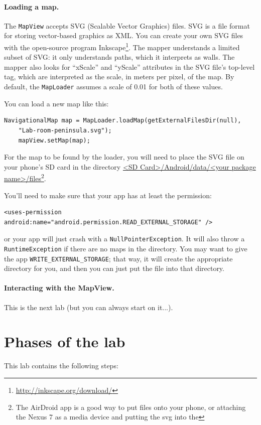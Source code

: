 \documentclass[10pt]{article}
\begin{document}
\paragraph{Loading a map.} The {\tt MapView} accepts SVG (Scalable Vector Graphics) files. SVG is a file format for storing vector-based graphics as XML. You can create your own SVG files with the open-source program Inkscape\footnote{\url{http://inkscape.org/download/}}. The mapper understands a limited subset of SVG: it only understands paths, which it interprets as walls. The mapper also looks for ``xScale'' and ``yScale'' attributes in the SVG file's top-level tag, which are interpreted as the scale, in meters per pixel, of the map. By default, the {\tt MapLoader} assumes a scale of 0.01 for both of these values. 

You can load a new map like this:
\begin{lstlisting}[basicstyle=\ttfamily\small]
    NavigationalMap map = MapLoader.loadMap(getExternalFilesDir(null), 
    "Lab-room-peninsula.svg");
    mapView.setMap(map);
\end{lstlisting}

For the map to be found by the loader, you will need to place the SVG file on your phone's SD card in the directory \url{<SD Card>/Android/data/<your package name>/files}\footnote{The AirDroid app is a good way to put files onto your phone, or attaching the Nexus 7 as a media device and putting the svg into the }. 


You'll need to make sure that your app has at least the permission:
\begin{lstlisting}
<uses-permission android:name="android.permission.READ_EXTERNAL_STORAGE" />
\end{lstlisting}
or your app will just crash with a {\tt NullPointerException}. It will also throw a {\tt RuntimeException} if there are no maps in the directory. You may want
to give the app {\tt WRITE\_EXTERNAL\_STORAGE}; that way, it will create 
the appropriate directory for you, and then you can just put the file into that
directory.



\paragraph{Interacting with the MapView.}
This is the next lab (but you can always start on it...).




\section{Phases of the lab}
This lab contains the following steps:
\end{document}
